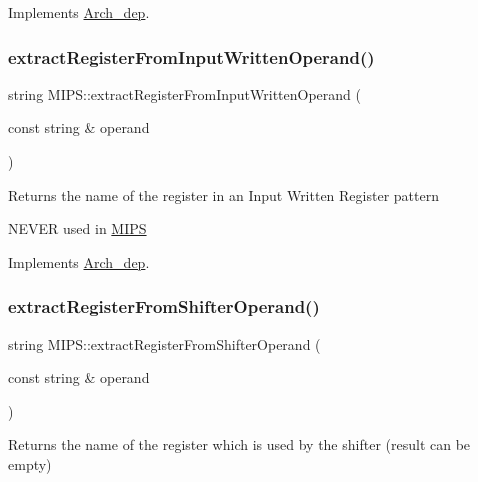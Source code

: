 Implements \hyperlink{classArch__dep_a4ef649eb06dedb67fe215fc7665f48ba}{Arch\+\_\+dep}.

\mbox{\label{classMIPS_a53017c6d42bb7bee24a36e45bf0300b9}} 
\subsubsection{\texorpdfstring{extract\+Register\+From\+Input\+Written\+Operand()}{extractRegisterFromInputWrittenOperand()}}
{\footnotesize\ttfamily string M\+I\+P\+S\+::extract\+Register\+From\+Input\+Written\+Operand (\begin{DoxyParamCaption}\item[{const string \&}]{operand }\end{DoxyParamCaption})\hspace{0.3cm}{\ttfamily [virtual]}}

Returns the name of the register in an Input Written Register pattern

N\+E\+V\+ER used in \hyperlink{classMIPS}{M\+I\+PS} 

Implements \hyperlink{classArch__dep_a286da739265c852e98f2efd622615b96}{Arch\+\_\+dep}.

\mbox{\label{classMIPS_ae48954f0e93827c1cb8225cac3857464}} 
\subsubsection{\texorpdfstring{extract\+Register\+From\+Shifter\+Operand()}{extractRegisterFromShifterOperand()}}
{\footnotesize\ttfamily string M\+I\+P\+S\+::extract\+Register\+From\+Shifter\+Operand (\begin{DoxyParamCaption}\item[{const string \&}]{operand }\end{DoxyParamCaption})\hspace{0.3cm}{\ttfamily [virtual]}}

Returns the name of the register which is used by the shifter (result can be empty)

